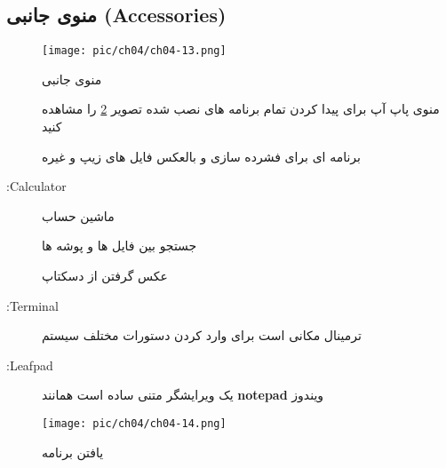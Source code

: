 \subsection{منوی جانبی (Accessories)}\label{se-386}
\begin{figure}[H]%
	\caption{منوی جانبی}
	\begin{center}
		\texttt{[image: pic/ch04/ch04-13.png]}
	\end{center}
	\label{pic-35}
\end{figure}
\begin{description}
	\item[] 
	منوی پاپ آپ برای پیدا کردن تمام برنامه های نصب شده تصویر
	\ref{pic-36}
	را مشاهده کنید
	\item[] 
	برنامه ای برای فشرده سازی و بالعکس فایل های زیپ و غیره
	\item[:Calculator] ماشین حساب
	\item[] جستجو بین فایل ها و پوشه ها
	\item[] عکس گرفتن از دسکتاپ 
	\item[:Terminal] ترمینال مکانی است برای وارد کردن دستورات مختلف سیستم
	\item[:Leafpad] یک ویرایشگر متنی ساده است همانند 
	\textbf{notepad}
	ویندوز	
\end{description}
\begin{figure}[H]%
	\caption{یافتن برنامه}
	\begin{center}
		\texttt{[image: pic/ch04/ch04-14.png]}
	\end{center}
	\label{pic-36}
\end{figure}